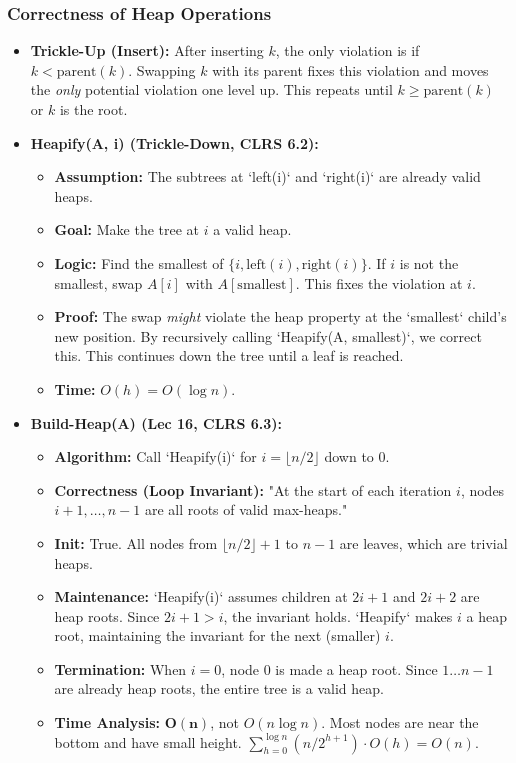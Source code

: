 \subsubsection{Correctness of Heap Operations}
\begin{itemize}
    \item \textbf{Trickle-Up (Insert):} After inserting $k$, the only violation is if $k < \text{parent}(k)$. Swapping $k$ with its parent fixes this violation and moves the \textit{only} potential violation one level up. This repeats until $k \ge \text{parent}(k)$ or $k$ is the root.
    
    \item \textbf{Heapify(A, i) (Trickle-Down, CLRS 6.2):}
    \begin{itemize}
        \item \textbf{Assumption:} The subtrees at `left(i)` and `right(i)` are already valid heaps.
        \item \textbf{Goal:} Make the tree at $i$ a valid heap.
        \item \textbf{Logic:} Find the smallest of $\{i, \text{left}(i), \text{right}(i)\}$. If $i$ is not the smallest, swap $A[i]$ with $A[\text{smallest}]$. This fixes the violation at $i$.
        \item \textbf{Proof:} The swap \textit{might} violate the heap property at the `smallest` child's new position. By recursively calling `Heapify(A, smallest)`, we correct this. This continues down the tree until a leaf is reached.
        \item \textbf{Time:} $O(h) = O(\log n)$.
    \end{itemize}
    
    \item \textbf{Build-Heap(A) (Lec 16, CLRS 6.3):}
    \begin{itemize}
        \item \textbf{Algorithm:} Call `Heapify(i)` for $i = \lfloor n/2 \rfloor$ down to $0$.
        \item \textbf{Correctness (Loop Invariant):} "At the start of each iteration $i$, nodes $i+1, \dots, n-1$ are all roots of valid max-heaps."
        \item \textbf{Init:} True. All nodes from $\lfloor n/2 \rfloor + 1$ to $n-1$ are leaves, which are trivial heaps.
        \item \textbf{Maintenance:} `Heapify(i)` assumes children at $2i+1$ and $2i+2$ are heap roots. Since $2i+1 > i$, the invariant holds. `Heapify` makes $i$ a heap root, maintaining the invariant for the next (smaller) $i$.
        \item \textbf{Termination:} When $i=0$, node 0 is made a heap root. Since $1 \dots n-1$ are already heap roots, the entire tree is a valid heap.
        \item \textbf{Time Analysis:} $\mathbf{O(n)}$, not $O(n \log n)$. Most nodes are near the bottom and have small height. $\sum_{h=0}^{\log n} (n/2^{h+1}) \cdot O(h) = O(n)$.
    \end{itemize}
\end{itemize}